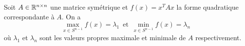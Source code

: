 


\begin{theorem}
  \label{thr:18}
  Soit $A \in \mathbb{R}^{n\times n}$ une matrice symétrique et $f(x) = x^TAx$ la forme quadratique correspondante à $A$. On a
  \begin{equation}
    \label{eq:11}
    \max_{x \in S^{n-1}} f(x) = \lambda_1  \, \text{ et } \,  \min_{x \in S^{n-1}} f(x)  = \lambda_n
  \end{equation}
  où $\lambda_1$ et $\lambda_n$ sont les valeurs propres maximale et minimale de $A$ respectivement. 
\end{theorem}

